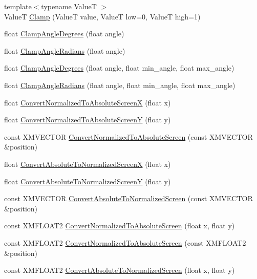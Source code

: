 \begin{DoxyCompactItemize}
\item 
{\footnotesize template$<$typename ValueT $>$ }\\ValueT \hyperlink{namespacemage_af377e4f18912fcbff49672a124c344b2}{Clamp} (ValueT value, ValueT low=0, ValueT high=1)
\item 
float \hyperlink{namespacemage_a0024d4f40403506605dc7ca57ff83d1f}{Clamp\+Angle\+Degrees} (float angle)
\item 
float \hyperlink{namespacemage_a0361d0febf0543c594a31fede401d157}{Clamp\+Angle\+Radians} (float angle)
\item 
float \hyperlink{namespacemage_a1cc8a7302f05f1e890dabc6fe98e1496}{Clamp\+Angle\+Degrees} (float angle, float min\+\_\+angle, float max\+\_\+angle)
\item 
float \hyperlink{namespacemage_a85caeb6cab349e4eff83919fbf430700}{Clamp\+Angle\+Radians} (float angle, float min\+\_\+angle, float max\+\_\+angle)
\item 
float \hyperlink{namespacemage_a2dbd3992e0bcb94b465ab4ab6b7d7f83}{Convert\+Normalized\+To\+Absolute\+ScreenX} (float x)
\item 
float \hyperlink{namespacemage_abc0e5fd9efdcd160a7c4e9b14c8ec7b6}{Convert\+Normalized\+To\+Absolute\+ScreenY} (float y)
\item 
const X\+M\+V\+E\+C\+T\+OR \hyperlink{namespacemage_a37cd57f31a66aac5355061bc3ad4e5ec}{Convert\+Normalized\+To\+Absolute\+Screen} (const X\+M\+V\+E\+C\+T\+OR \&position)
\item 
float \hyperlink{namespacemage_a7ad05dbf5e2b5d625daf57f43b26217f}{Convert\+Absolute\+To\+Normalized\+ScreenX} (float x)
\item 
float \hyperlink{namespacemage_a4300e91e448d76e1015cbc806c1d4467}{Convert\+Absolute\+To\+Normalized\+ScreenY} (float y)
\item 
const X\+M\+V\+E\+C\+T\+OR \hyperlink{namespacemage_add9fc09b8a7166c5e0d0bde63d8f2747}{Convert\+Absolute\+To\+Normalized\+Screen} (const X\+M\+V\+E\+C\+T\+OR \&position)
\item 
const X\+M\+F\+L\+O\+A\+T2 \hyperlink{namespacemage_a34b18c1eb8d1e94675b10c86845e2564}{Convert\+Normalized\+To\+Absolute\+Screen} (float x, float y)
\item 
const X\+M\+F\+L\+O\+A\+T2 \hyperlink{namespacemage_aec1ce8ea913d981f727765f39f79d5e3}{Convert\+Normalized\+To\+Absolute\+Screen} (const X\+M\+F\+L\+O\+A\+T2 \&position)
\item 
const X\+M\+F\+L\+O\+A\+T2 \hyperlink{namespacemage_a98a82c6ca513d50f16d4ee6256fdac29}{Convert\+Absolute\+To\+Normalized\+Screen} (float x, float y)

\end{DoxyCompactItemize}
